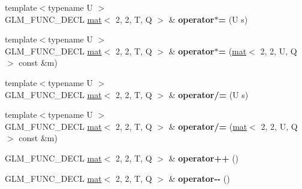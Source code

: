 \begin{DoxyCompactItemize}
\item 
\mbox{\label{structglm_1_1mat_3_012_00_012_00_01T_00_01Q_01_4_a1e8b90af651add45504f00f373c747d0}} 
{\footnotesize template$<$typename U $>$ }\\G\+L\+M\+\_\+\+F\+U\+N\+C\+\_\+\+D\+E\+CL \hyperlink{structglm_1_1mat}{mat}$<$ 2, 2, T, Q $>$ \& {\bfseries operator$\ast$=} (U s)
\item 
\mbox{\label{structglm_1_1mat_3_012_00_012_00_01T_00_01Q_01_4_a607bdac0a14d0661db17d7400355e552}} 
{\footnotesize template$<$typename U $>$ }\\G\+L\+M\+\_\+\+F\+U\+N\+C\+\_\+\+D\+E\+CL \hyperlink{structglm_1_1mat}{mat}$<$ 2, 2, T, Q $>$ \& {\bfseries operator$\ast$=} (\hyperlink{structglm_1_1mat}{mat}$<$ 2, 2, U, Q $>$ const \&m)
\item 
\mbox{\label{structglm_1_1mat_3_012_00_012_00_01T_00_01Q_01_4_ab98e68a1fdc89639690e42ff6a66aa9f}} 
{\footnotesize template$<$typename U $>$ }\\G\+L\+M\+\_\+\+F\+U\+N\+C\+\_\+\+D\+E\+CL \hyperlink{structglm_1_1mat}{mat}$<$ 2, 2, T, Q $>$ \& {\bfseries operator/=} (U s)
\item 
\mbox{\label{structglm_1_1mat_3_012_00_012_00_01T_00_01Q_01_4_a63b8f35b3a04bd1ac0a293a41f221871}} 
{\footnotesize template$<$typename U $>$ }\\G\+L\+M\+\_\+\+F\+U\+N\+C\+\_\+\+D\+E\+CL \hyperlink{structglm_1_1mat}{mat}$<$ 2, 2, T, Q $>$ \& {\bfseries operator/=} (\hyperlink{structglm_1_1mat}{mat}$<$ 2, 2, U, Q $>$ const \&m)
\item 
\mbox{\label{structglm_1_1mat_3_012_00_012_00_01T_00_01Q_01_4_a3ba78b4e4d01ba944fab26b8286acac4}} 
G\+L\+M\+\_\+\+F\+U\+N\+C\+\_\+\+D\+E\+CL \hyperlink{structglm_1_1mat}{mat}$<$ 2, 2, T, Q $>$ \& {\bfseries operator++} ()
\item 
\mbox{\label{structglm_1_1mat_3_012_00_012_00_01T_00_01Q_01_4_a5ce05a8b04a45281df148d4b9a0bd5dc}} 
G\+L\+M\+\_\+\+F\+U\+N\+C\+\_\+\+D\+E\+CL \hyperlink{structglm_1_1mat}{mat}$<$ 2, 2, T, Q $>$ \& {\bfseries operator-\/-\/} ()

\end{DoxyCompactItemize}
